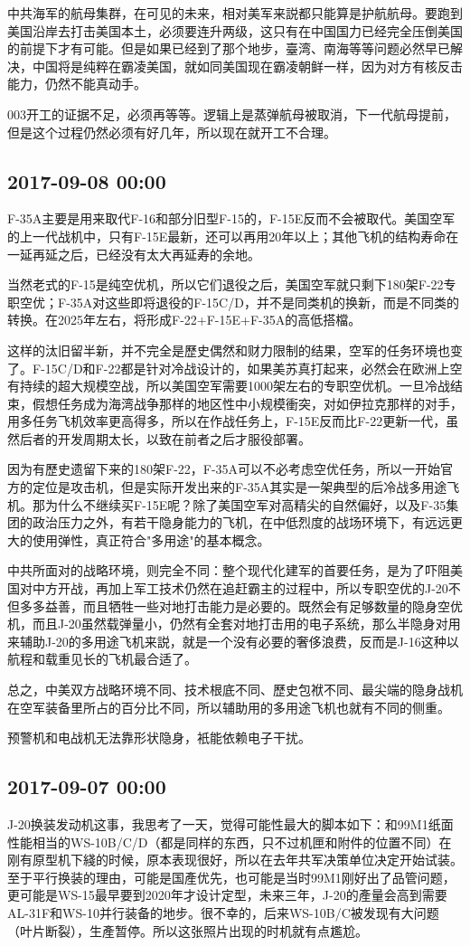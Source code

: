 \documentclass[twocolumn]{ctexart}
\begin{document}
中共海军的航母集群，在可见的未来，相对美军来説都只能算是护航航母。要跑到美国沿岸去打击美国本土，必须要连升两级，这只有在中国国力已经完全压倒美国的前提下才有可能。但是如果已经到了那个地步，臺湾、南海等等问题必然早已解决，中国将是纯粹在霸凌美国，就如同美国现在霸凌朝鲜一样，因为对方有核反击能力，仍然不能真动手。

003开工的证据不足，必须再等等。逻辑上是蒸弹航母被取消，下一代航母提前，但是这个过程仍然必须有好几年，所以现在就开工不合理。\subsection*{2017-09-08 00:00}
F-35A主要是用来取代F-16和部分旧型F-15的，F-15E反而不会被取代。美国空军的上一代战机中，只有F-15E最新，还可以再用20年以上；其他飞机的结构寿命在一延再延之后，已经没有太大再延寿的余地。

当然老式的F-15是纯空优机，所以它们退役之后，美国空军就只剩下180架F-22专职空优；F-35A对这些即将退役的F-15C/D，并不是同类机的换新，而是不同类的转换。在2025年左右，将形成F-22+F-15E+F-35A的高低搭檔。

这样的汰旧留半新，并不完全是歷史偶然和财力限制的结果，空军的任务环境也变了。F-15C/D和F-22都是针对冷战设计的，如果美苏真打起来，必然会在欧洲上空有持续的超大规模空战，所以美国空军需要1000架左右的专职空优机。一旦冷战结束，假想任务成为海湾战争那样的地区性中小规模衝突，对如伊拉克那样的对手，用多任务飞机效率更高得多，所以在作战任务上，F-15E反而比F-22更新一代，虽然后者的开发周期太长，以致在前者之后才服役部署。

因为有歷史遗留下来的180架F-22，F-35A可以不必考虑空优任务，所以一开始官方的定位是攻击机，但是实际开发出来的F-35A其实是一架典型的后冷战多用途飞机。那为什么不继续买F-15E呢？除了美国空军对高精尖的自然偏好，以及F-35集团的政治压力之外，有若干隐身能力的飞机，在中低烈度的战场环境下，有远远更大的使用弹性，真正符合"多用途"的基本概念。

中共所面对的战略环境，则完全不同：整个现代化建军的首要任务，是为了吓阻美国对中方开战，再加上军工技术仍然在追赶霸主的过程中，所以专职空优的J-20不但多多益善，而且牺牲一些对地打击能力是必要的。既然会有足够数量的隐身空优机，而且J-20虽然载弹量小，仍然有全套对地打击用的电子系统，那么半隐身对用来辅助J-20的多用途飞机来説，就是一个没有必要的奢侈浪费，反而是J-16这种以航程和载重见长的飞机最合适了。

总之，中美双方战略环境不同、技术根底不同、歷史包袱不同、最尖端的隐身战机在空军装备里所占的百分比不同，所以辅助用的多用途飞机也就有不同的侧重。

预警机和电战机无法靠形状隐身，衹能依赖电子干扰。\subsection*{2017-09-07 00:00}
J-20换装发动机这事，我思考了一天，觉得可能性最大的脚本如下：和99M1纸面性能相当的WS-10B/C/D（都是同样的东西，只不过机匣和附件的位置不同）在刚有原型机下綫的时候，原本表现很好，所以在去年共军决策单位决定开始试装。至于平行换装的理由，可能是国產优先，也可能是当时99M1刚好出了品管问题，更可能是WS-15最早要到2020年才设计定型，未来三年，J-20的產量会高到需要AL-31F和WS-10并行装备的地步。很不幸的，后来WS-10B/C被发现有大问题（叶片断裂），生產暂停。所以这张照片出现的时机就有点尷尬。
\end{document}
